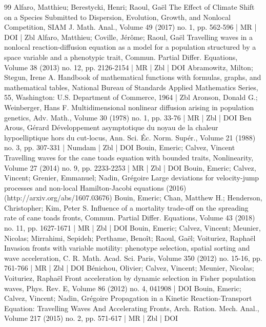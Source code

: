 \begin{thebibliography}{99}
Alfaro, Matthieu; Berestycki, Henri; Raoul, Gaël The Effect of Climate Shift on a Species Submitted to Dispersion, Evolution, Growth, and Nonlocal Competition, SIAM J. Math. Anal., Volume 49 (2017) no. 1, pp. 562-596 | MR | DOI | Zbl
Alfaro, Matthieu; Coville, Jérôme; Raoul, Gaël Travelling waves in a nonlocal reaction-diffusion equation as a model for a population structured by a space variable and a phenotypic trait, Commun. Partial Differ. Equations, Volume 38 (2013) no. 12, pp. 2126-2154 | MR | Zbl | DOI
Abramowitz, Milton; Stegun, Irene A. Handbook of mathematical functions with formulas, graphs, and mathematical tables, National Bureau of Standards Applied Mathematics Series, 55, Washington: U.S. Department of Commerce, 1964 | Zbl
Aronson, Donald G.; Weinberger, Hans F. Multidimensional nonlinear diffusion arising in population genetics, Adv. Math., Volume 30 (1978) no. 1, pp. 33-76 | MR | Zbl | DOI
Ben Arous, Gérard Développement asymptotique du noyau de la chaleur hypoelliptique hors du cut-locus, Ann. Sci. Éc. Norm. Supér., Volume 21 (1988) no. 3, pp. 307-331 | Numdam | Zbl | DOI
Bouin, Emeric; Calvez, Vincent Travelling waves for the cane toads equation with bounded traits, Nonlinearity, Volume 27 (2014) no. 9, pp. 2233-2253 | MR | Zbl | DOI
Bouin, Emeric; Calvez, Vincent; Grenier, Emmanuel; Nadin, Grégoire Large deviations for velocity-jump processes and non-local Hamilton-Jacobi equations (2016) (http://arxiv.org/abs/1607.03676)
Bouin, Emeric; Chan, Matthew H.; Henderson, Christopher; Kim, Peter S. Influence of a mortality trade-off on the spreading rate of cane toads fronts, Commun. Partial Differ. Equations, Volume 43 (2018) no. 11, pp. 1627-1671 | MR | Zbl | DOI
Bouin, Emeric; Calvez, Vincent; Meunier, Nicolas; Mirrahimi, Sepideh; Perthame, Benoît; Raoul, Gaël; Voituriez, Raphaël Invasion fronts with variable motility: phenotype selection, spatial sorting and wave acceleration, C. R. Math. Acad. Sci. Paris, Volume 350 (2012) no. 15-16, pp. 761-766 | MR | Zbl | DOI
Bénichou, Olivier; Calvez, Vincent; Meunier, Nicolas; Voituriez, Raphaël Front acceleration by dynamic selection in Fisher population waves, Phys. Rev. E, Volume 86 (2012) no. 4, 041908 | DOI
Bouin, Emeric; Calvez, Vincent; Nadin, Grégoire Propagation in a Kinetic Reaction-Transport Equation: Travelling Waves And Accelerating Fronts, Arch. Ration. Mech. Anal., Volume 217 (2015) no. 2, pp. 571-617 | MR | Zbl | DOI

\end{thebibliography}
